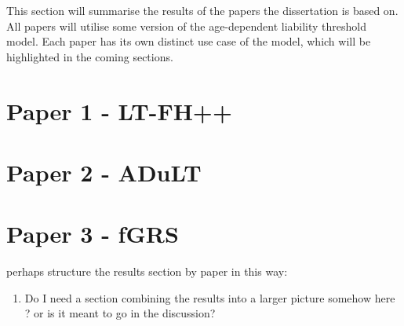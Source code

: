 


This section will summarise the results of the papers the dissertation is based on. All papers will utilise some version of the age-dependent liability threshold model. Each paper has its own distinct use case of the model, which will be highlighted in the coming sections.

\section{Paper 1 - LT-FH++}

\newpage

\section{Paper 2 - ADuLT}

\newpage

\section{Paper 3 - fGRS}

\newpage



perhaps structure the results section by paper in this way:

\begin{enumerate}
	\item Do I need a section combining the results into a larger picture somehow here ? or is it meant to go in the discussion?
\end{enumerate}
